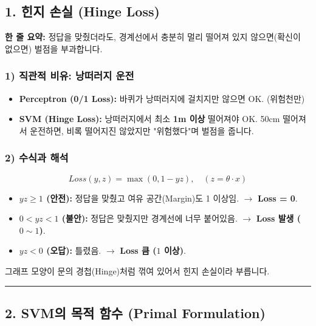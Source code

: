 \documentclass[11pt,a4paper]{book}
\theoremstyle{definition}
\begin{document}
\subsection{1. 힌지 손실 (Hinge Loss)}


\begin{conceptbox}[title={개념 1: 턱걸이는 인정하지 않는다}]
\textbf{한 줄 요약:} 정답을 맞췄더라도, 경계선에서 충분히 멀리 떨어져 있지 않으면(확신이 없으면) 벌점을 부과합니다.
\end{conceptbox}

\subsubsection*{1) 직관적 비유: 낭떠러지 운전}
\begin{itemize}
    \item \textbf{Perceptron (0/1 Loss):} 바퀴가 낭떠러지에 걸치지만 않으면 OK. (위험천만)
    \item \textbf{SVM (Hinge Loss):} 낭떠러지에서 최소 \textbf{1m 이상} 떨어져야 OK. 50cm 떨어져서 운전하면, 비록 떨어지진 않았지만 "위험했다"며 벌점을 줍니다.
\end{itemize}

\subsubsection*{2) 수식과 해석}
$$ Loss(y, z) = \max(0, 1 - yz), \quad (z = \theta \cdot x) $$
\begin{itemize}
    \item \textbf{$yz \ge 1$ (안전):} 정답을 맞췄고 여유 공간(Margin)도 1 이상임. $\rightarrow$ \textbf{Loss = 0}.
    \item \textbf{$0 < yz < 1$ (불안):} 정답은 맞췄지만 경계선에 너무 붙어있음. $\rightarrow$ \textbf{Loss 발생 ($0 \sim 1$)}.
    \item \textbf{$yz < 0$ (오답):} 틀렸음. $\rightarrow$ \textbf{Loss 큼 ($1$ 이상)}.
\end{itemize}
그래프 모양이 문의 경첩(Hinge)처럼 꺾여 있어서 힌지 손실이라 부릅니다.

\vspace{0.5cm}\hrule\vspace{0.5cm}

\subsection{2. SVM의 목적 함수 (Primal Formulation)}
\end{document}
